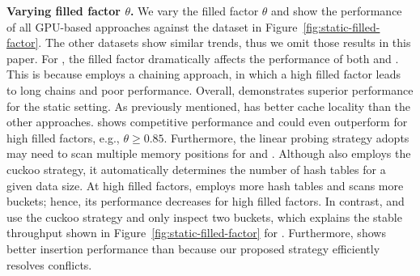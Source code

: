\vspace{1mm}\noindent\textbf{Varying filled factor $\theta$.}
We vary the filled factor $\theta$ and show the performance of all GPU-based approaches against the \dsrandom dataset in Figure~\ref{fig:static-filled-factor}. The other datasets show similar trends, thus we omit those results in this paper.
For \slab, the filled factor dramatically affects the performance of both  and . This is because \slab employs a chaining approach, in which a high filled factor leads to long chains and poor performance.
Overall, \warp demonstrates superior performance for the static setting. As previously mentioned, \warp has better cache locality than the other approaches. 
\voter shows competitive performance and could even outperform \warp for high filled factors, e.g., $\theta \geq 0.85$. Furthermore, the linear probing strategy \warp adopts may need to scan multiple memory positions for  and . Although \cudpp also employs the cuckoo strategy, it automatically determines the number of hash tables for a given data size. At high filled factors, \cudpp employs more hash tables and scans more buckets; hence, its performance decreases for high filled factors. In contrast, \voter and \megakv use the cuckoo strategy and only inspect two buckets, which explains the stable throughput shown in Figure~\ref{fig:static-filled-factor} for . Furthermore, \voter shows better insertion performance than \megakv because our proposed strategy efficiently resolves conflicts.




